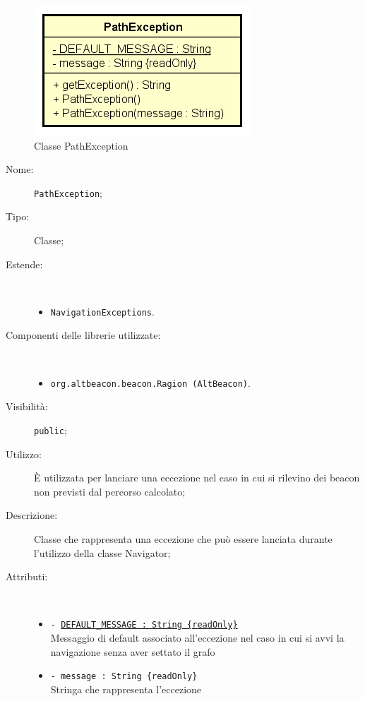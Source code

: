 \documentclass[../DefinizioneDiProdotto.tex]{subfiles}
\begin{document}
    \begin{figure}[H]
        \centering
        \includegraphics{img/PathException.png}
        \caption{Classe PathException}\label{fig:model::navigator::PathException} 
    \end{figure}
    \begin{description}
\item[Nome:] \texttt{PathException};
\item[Tipo:] Classe;
\item[Estende:] \
\begin{itemize}
\item \texttt{NavigationExceptions}.
\end{itemize}
\item[Componenti delle librerie utilizzate:] \
\begin{itemize}
\item \texttt{org.altbeacon.beacon.Ragion (AltBeacon)}.

\end{itemize}
\item[Visibilità:] \texttt{public};
\item[Utilizzo:] È utilizzata per lanciare una eccezione nel caso in cui si rilevino dei beacon non previsti dal percorso calcolato;
\item[Descrizione:] Classe che rappresenta una eccezione che può essere lanciata durante l'utilizzo della classe Navigator;
\item[Attributi:] \
\begin{itemize}
\item \texttt{- \underline{DEFAULT\_MESSAGE : String \{readOnly\}}}\\
Messaggio di default associato all'eccezione nel caso in cui si avvi la navigazione senza aver settato il grafo

\item \texttt{- message : String \{readOnly\}}\\
Stringa che rappresenta l'eccezione


\end{itemize}
\end{description}
\end{document}
